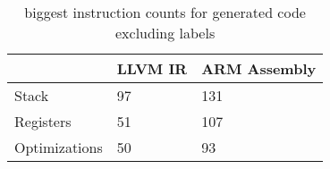 \begin{table}[h!]
\centering
\begin{tabular}{p{}p{}p{}}
  \hline
 & LLVM IR & ARM Assembly \\ 
  \hline
Stack &  97 & 131 \\ 
  Registers &  51 & 107 \\ 
  Optimizations &  50 &  93 \\ 
   \hline
\end{tabular}
\caption{biggest instruction counts for generated code excluding labels}
\end{table}

